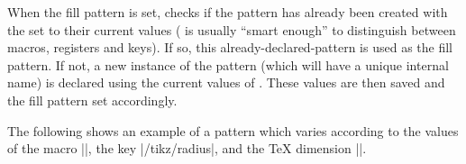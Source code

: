 \begin{command}{\pgfdeclarepatternformonly%
}
    When the fill pattern is set, \pgfname{} checks if the pattern has already
    been created with the  set to their current values
    (\pgfname{} is usually ``smart enough'' to distinguish between macros,
    registers and keys). If so, this already-declared-pattern is used as the
    fill pattern. If not, a new instance of the pattern (which will have a
    unique internal name) is declared using the current values of
    . These values are then saved and the fill pattern set
    accordingly.

    The following shows an example of a pattern which varies according to the
    values of the macro |\size|, the key |/tikz/radius|, and the \TeX{}
    dimension |\thickness|.
\begin{codeexample}[preamble={\usetikzlibrary{patterns}}]
{}
{}
{\pgfpoint{\size}{\size}}
{
  \pgfsetlinewidth{\thickness}
  \pgfpathcircle{}
}
\newdimen\thickness
{}
\end{codeexample}
\end{command}

